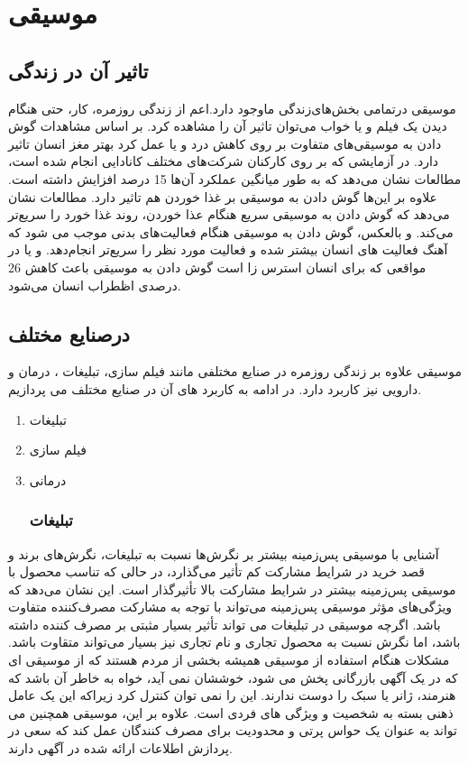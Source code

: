 \chapter{موسیقی}
\section{تاثیر‌ آن‌ در‌ زندگی}

موسیقی درتمامی بخش‌های‌زندگی ماوجود دارد.اعم از زندگی روزمره،  کار، حتی هنگام دیدن یک فیلم و یا خواب می‌توان تاثیر آن را مشاهده کرد. بر اساس مشاهدات گوش دادن به موسیقی‌های متفاوت بر روی کاهش درد و  یا عمل کرد بهتر مغز انسان تاثیر دارد. 
در آزمایشی که بر روی کارکنان شرکت‌های مختلف کانادایی انجام شده است، مطالعات نشان می‌دهد که به طور میانگین عملکرد آن‌ها 15 درصد افزایش داشته است. علاوه بر این‌ها گوش دادن به موسیقی بر غذا خوردن هم تاثیر دارد. مطالعات نشان می‌دهد که گوش دادن به موسیقی سریع هنگام عذا خوردن، روند غذا خورد را سریع‌تر می‌کند. و بالعکس، گوش دادن به موسیقی هنگام فعالیت‌های بدنی موجب می شود که آهنگ فعالیت های انسان بیشتر شده و فعالیت مورد نظر را سریع‌تر انجام‌دهد.
و یا در مواقعی که برای انسان استرس زا است گوش دادن به موسیقی باعث کاهش 26 درصدی اظطراب انسان می‌شود.
\cite{lesiuk2005effect,siedliecki2006effect,roballey1985effect,anshel1978effect,pelletier2004effect}
\section{در‌صنایع ‌مختلف}\label{sec2}
موسیقی علاوه بر زندگی روزمره در صنایع مختلفی مانند فیلم سازی، تبلیغات ، درمان و دارویی نیز کاربرد دارد. در ادامه به کاربرد های آن در صنایع مختلف می پردازیم.
\begin{enumerate}
\item  {تبلیغات}
\item { فیلم سازی}
\item  {درمانی}
\subsection{تبلیغات}
\end{enumerate}
  آشنایی با موسیقی پس‌زمینه بیشتر بر نگرش‌ها نسبت به تبلیغات،  نگرش‌های برند و قصد خرید در شرایط مشارکت کم تأثیر می‌گذارد،  در حالی که تناسب محصول با موسیقی پس‌زمینه بیشتر در شرایط مشارکت بالا تأثیرگذار است.  این نشان می‌دهد که ویژگی‌های مؤثر موسیقی پس‌زمینه می‌تواند با توجه به مشارکت مصرف‌کننده متفاوت باشد. 
اگرچه موسیقی در تبلیغات می تواند تأثیر بسیار مثبتی بر مصرف کننده داشته باشد، اما
نگرش نسبت به محصول تجاری و نام تجاری نیز بسیار می‌تواند متقاوت باشد. 
مشکلات هنگام استفاده از موسیقی همیشه بخشی از مردم هستند که
از موسیقی ای که در یک آگهی بازرگانی پخش می شود، خوششان نمی آید، خواه به خاطر آن باشد که 
هنرمند،  ژانر یا سبک را دوست ندارند.  این را نمی توان کنترل کرد زیراکه این
یک عامل ذهنی بسته به شخصیت و ویژگی های فردی است. 
علاوه بر این، موسیقی همچنین می تواند به عنوان یک حواس پرتی و محدودیت برای مصرف کنندگان عمل کند
که سعی در پردازش اطلاعات ارائه شده در آگهی دارند. 
\cite{hee2014attributes,hoeberichts2012music}
